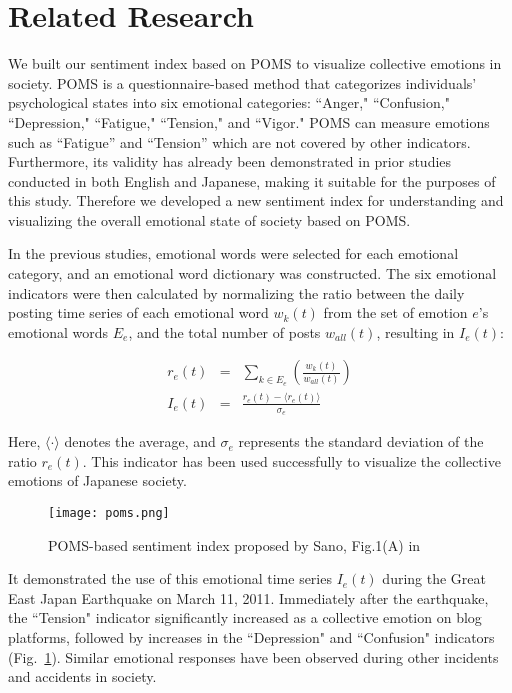 \section{Related Research}
We built our sentiment index based on POMS\cite{POMS_enqutte} to visualize collective emotions in society. 
POMS is a questionnaire-based method that categorizes individuals' psychological states into six emotional categories: ``Anger," ``Confusion," ``Depression," ``Fatigue," ``Tension," and ``Vigor." 
POMS can measure emotions such as ``Fatigue'' and ``Tension'' which are not covered by other indicators. 
Furthermore, its validity has already been demonstrated in prior studies conducted in both English\cite{Bollen2} and Japanese\cite{POMS_PLOS}, making it suitable for the purposes of this study.
Therefore we developed a new sentiment index for understanding and visualizing the overall emotional state of society based on POMS.

In the previous studies\cite{POMS_PLOS,POMS_origin}, emotional words were selected for each emotional category, and an emotional word dictionary was constructed. The six emotional indicators were then calculated by normalizing the ratio between the daily posting time series of each emotional word $w_{k}(t)$ from the set of emotion $e$'s emotional words $E_{e}$, and the total number of posts $w_{all}(t)$, resulting in $I_{e}(t)$:

\begin{eqnarray} r_{e}(t) &=& \sum_{k \in E_{e}}\left(\frac{w_{k}(t)}{w_{all}(t)} \right) \\
I_{e}(t) &=& \frac{r_{e}(t)- \langle r_{e}(t) \rangle }{\sigma_{e}}
\end{eqnarray}

Here, $\langle \cdot \rangle$ denotes the average, and $\sigma_{e}$ represents the standard deviation of the ratio $r_{e}(t)$. This indicator has been used successfully to visualize the collective emotions of Japanese society.

\begin{figure}[tb] \centering \texttt{[image: poms.png]} \caption{POMS-based sentiment index proposed by Sano, Fig.1(A) in \cite{POMS_PLOS}} \label{fig1} \end{figure}

It demonstrated the use of this emotional time series $I_e(t)$ during the Great East Japan Earthquake on March 11, 2011. Immediately after the earthquake, the ``Tension" indicator significantly increased as a collective emotion on blog platforms, followed by increases in the ``Depression" and ``Confusion" indicators (Fig.~\ref{fig1}). Similar emotional responses have been observed during other incidents and accidents in society.

